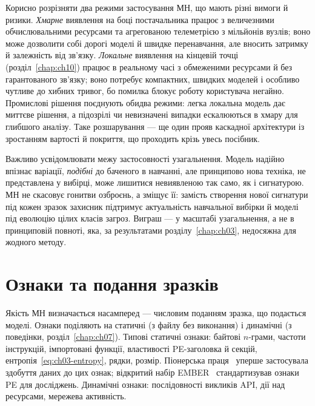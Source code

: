 Корисно розрізняти два режими застосування МН, що мають різні вимоги й ризики. \emph{Хмарне} виявлення на боці постачальника працює з величезними обчислювальними ресурсами та агрегованою телеметрією з мільйонів вузлів; воно може дозволити собі дорогі моделі й швидке перенавчання, але вносить затримку й залежність від зв'язку. \emph{Локальне} виявлення на кінцевій точці (розділ~\ref{chap:ch10}) працює в реальному часі з обмеженими ресурсами й без гарантованого зв'язку; воно потребує компактних, швидких моделей і особливо чутливе до хибних тривог, бо помилка блокує роботу користувача негайно. Промислові рішення поєднують обидва режими: легка локальна модель дає миттєве рішення, а підозрілі чи невизначені випадки ескалюються в хмару для глибшого аналізу. Таке розшарування --- ще один прояв каскадної архітектури із зростанням вартості й покриття, що проходить крізь увесь посібник.

Важливо усвідомлювати межу застосовності узагальнення. Модель надійно впізнає варіації, \emph{подібні} до баченого в навчанні, але принципово нова техніка, не представлена у вибірці, може лишитися невиявленою так само, як і сигнатурою. МН не скасовує гонитви озброєнь, а зміщує її: замість створення нової сигнатури під кожен зразок захисник підтримує актуальність навчальної вибірки й моделі під еволюцію цілих класів загроз. Виграш --- у масштабі узагальнення, а не в принциповій повноті, яка, за результатами розділу~\ref{chap:ch03}, недосяжна для жодного методу.

\section{Ознаки та подання зразків}\label{sec:ch09-features}

Якість МН визначається насамперед  --- числовим поданням зразка, що подається моделі. Ознаки поділяють на статичні (з файлу без виконання) і динамічні (з поведінки, розділ~\ref{chap:ch07}). Типові статичні ознаки: байтові $n$-грами, частоти інструкцій, імпортовані функції, властивості PE-заголовка й секцій, ентропія~\eqref{eq:ch03-entropy}, рядки, розмір. Піонерська праця~\cite{ch09:schultz} уперше застосувала здобуття даних до цих ознак; відкритий набір EMBER~\cite{ch09:ember} стандартизував ознаки PE для досліджень. Динамічні ознаки: послідовності викликів API, дії над ресурсами, мережева активність.

\begin{tikzfig}
\end{tikzfig}

